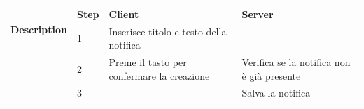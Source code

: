 \begin{table}[H]
\begin{tabularx}{\linewidth}{|l|X|X|X|}
    \hline \multirow{2}{*}{\textbf{Description}} & \textbf{Step}                                                                     &
    \textbf{Client}                              & \textbf{Server}                                                                                                                                                             \\
    \cline{2-4}                                  & 1                                                                                 & Inserisce titolo e testo della notifica    &                                            \\
    \cline{2-4}                                  & 2                                                                                 & Preme il tasto per confermare la creazione & Verifica se la notifica non è già presente \\
    \cline{2-4}                                  & 3                                                                                 &                                            & Salva la notifica                          \\
    \hline
  \end{tabularx}

\end{table}
\newpage
